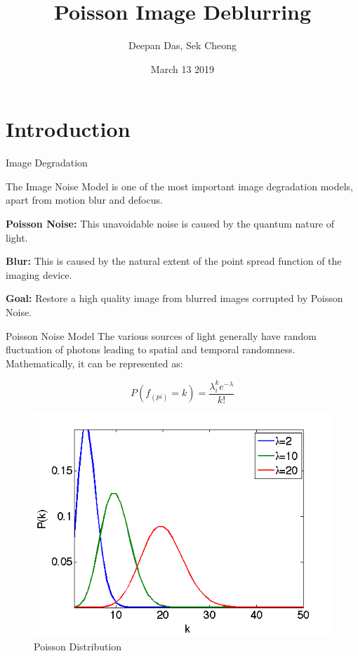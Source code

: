 \documentclass{beamer}
\title[Poisson Deblurring]{Poisson Image Deblurring}
\author{Deepan Das, Sek Cheong}
\institute{University of Wisconsin, Madison}
\date{March 13 2019}
\begin{document}
\begin{frame}
\titlepage
\end{frame}

\section{Introduction}
\begin{frame}[t]{Image Degradation}

The Image Noise Model is one of the most important image degradation models, apart from motion blur and defocus. 

\vspace{1.2cm}

\textbf{Poisson Noise: }This unavoidable noise is caused by the quantum nature of light.

\vspace{0.2cm}
\textbf{Blur: }This is caused by the natural extent of the point spread function of the imaging device.

\vspace{1.2cm}
\textbf{Goal: } Restore a high quality image from blurred images corrupted by Poisson Noise.

\end{frame}

\begin{frame}{Poisson Noise Model}
The various sources of light generally have random fluctuation of photons leading to spatial and temporal randomness. Mathematically, it can be represented as: 

\[
    P(f_{(pi)}=k) = \frac{\lambda^{k}_{i} e^{-\lambda}}{k!}
\] 
\begin{figure}
    \centering
    \includegraphics[scale=0.2]{poisson_dist.png}
    \caption{Poisson Distribution}
    \label{fig:my_label}
\end{figure}
\end{frame}
\end{document}
